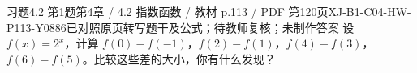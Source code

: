 \par\noindent\begin{minipage}{\linewidth}
\begin{bankitem}{习题4.2 第1题}{第4章 / 4.2 指数函数 / 教材 p.113 / PDF 第120页}{XJ-B1-C04-HW-P113-Y0886}{已对照原页转写题干及公式；待教师复核；未制作答案}
设 $f(x)=2^x$，计算 $f(0)-f(-1)$，$f(2)-f(1)$，$f(4)-f(3)$，$f(6)-f(5)$。比较这些差的大小，你有什么发现？
\end{bankitem}
\end{minipage}\par\medskip
